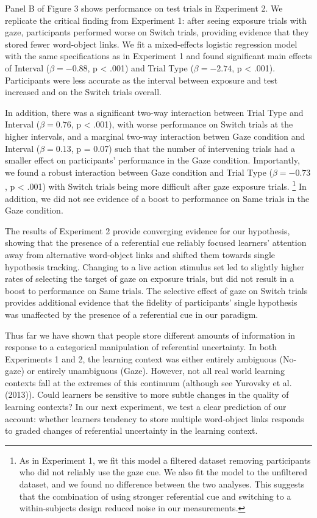 \documentclass[a4paper,man,natbib]{apa6}
\begin{document}
Panel B of Figure 3 shows performance on test trials in Experiment 2. We
replicate the critical finding from Experiment 1: after seeing exposure
trials with gaze, participants performed worse on Switch trials,
providing evidence that they stored fewer word-object links. We fit a
mixed-effects logistic regression model with the same specifications as
in Experiment 1 and found significant main effects of Interval
(\(\beta = -0.88\), p \textless{} .001) and Trial Type
(\(\beta = -2.74\), p \textless{} .001). Participants were less accurate
as the interval between exposure and test increased and on the Switch
trials overall.

In addition, there was a significant two-way interaction between Trial
Type and Interval (\(\beta = 0.76\), p \textless{} .001), with worse
performance on Switch trials at the higher intervals, and a marginal
two-way interaction betwen Gaze condition and Interval
(\(\beta = 0.13\), p = 0.07) such that the number of intervening trials
had a smaller effect on participants' performance in the Gaze condition.
Importantly, we found a robust interaction between Gaze condition and
Trial Type (\(\beta = -0.73\), p \textless{} .001) with Switch trials
being more difficult after gaze exposure trials.
\footnote{As in Experiment 1, we fit this model a filtered dataset removing participants who did not reliably use the gaze cue. We also fit the model to the unfiltered dataset, and we found no difference between the two analyses. This suggests that the combination of using stronger referential cue and switching to a within-subjects design reduced noise in our measurements.}
In addition, we did not see evidence of a boost to performance on Same
trials in the Gaze condition.

The results of Experiment 2 provide converging evidence for our
hypothesis, showing that the presence of a referential cue reliably
focused learners' attention away from alternative word-object links and
shifted them towards single hypothesis tracking. Changing to a live
action stimulus set led to slightly higher rates of selecting the target
of gaze on exposure trials, but did not result in a boost to performance
on Same trials. The selective effect of gaze on Switch trials provides
additional evidence that the fidelity of participants' single hypothesis
was unaffected by the presence of a referential cue in our paradigm.

Thus far we have shown that people store different amounts of
information in response to a categorical manipulation of referential
uncertainty. In both Experiments 1 and 2, the learning context was
either entirely ambiguous (No-gaze) or entirely unambiguous (Gaze).
However, not all real world learning contexts fall at the extremes of
this continuum (although see Yurovsky et al. (2013)). Could learners be
sensitive to more subtle changes in the quality of learning contexts? In
our next experiment, we test a clear prediction of our account: whether
learners tendency to store multiple word-object links responds to graded
changes of referential uncertainty in the learning context.
\end{document}
